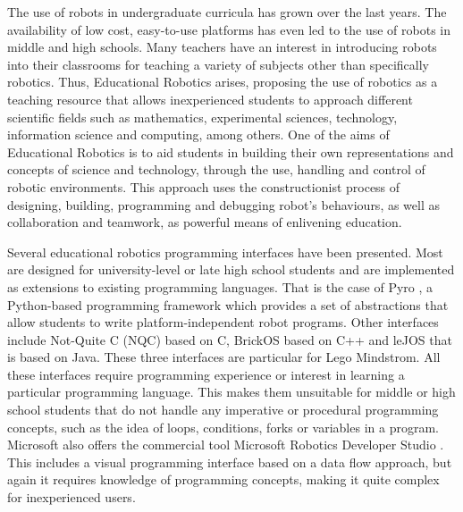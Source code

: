 
The use of robots in undergraduate curricula has grown over the last years. The availability of low cost, easy-to-use platforms has even led to the use of robots in middle and high schools. Many teachers have an interest in introducing robots into their classrooms for teaching a variety of subjects other than specifically robotics. Thus, Educational Robotics arises, proposing the use of robotics as a teaching resource that allows inexperienced students to approach different scientific fields such as mathematics, experimental sciences, technology, information science and computing, among others. One of the aims of Educational Robotics is to aid students in building their own representations and concepts of science and technology, through the use, handling and control of robotic environments. This approach uses the constructionist process of designing, building, programming and debugging robot's behaviours, as well as collaboration and teamwork, as powerful means of enlivening education. 

Several educational robotics programming interfaces have been presented. Most are designed for university-level or late high school students and are implemented as extensions to existing programming languages. That is the case of Pyro \cite{pyro}, a Python-based programming framework which provides a set of abstractions that allow students to write platform-independent robot programs. Other interfaces include Not-Quite C (NQC) \cite{nqc} based on C, BrickOS \cite{brickos} based on C++ and leJOS \cite{lejos} that is based on Java. These three interfaces are particular for Lego Mindstrom. All these interfaces require programming experience or interest in learning a particular programming language. This makes them unsuitable for middle or high school students that do not handle any imperative or procedural programming concepts, such as the idea of loops, conditions, forks or variables in a program. %
Microsoft also offers the commercial tool Microsoft Robotics Developer Studio \cite{mrds}. This includes a visual programming interface based on a data flow approach, but again it requires knowledge of programming concepts, making it quite complex for inexperienced users. 


